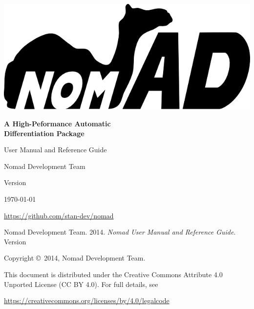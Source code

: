 
\includegraphics[width=6in]{../logo/logo.png}

\thispagestyle{empty}
\begin{center}

{ \Huge \textbf{ A High-Peformance Automatic \\ Differentiation Package} }

\vspace{10mm}

{ \LARGE User Manual and Reference Guide }

\vspace{20mm}

{ \Large Nomad Development Team }

\vfill

{ \Large

Version \nomadversion

\today

\url{https://github.com/stan-dev/nomad}

}

\end{center}

\newpage
\thispagestyle{empty}

\mbox{}
\vfill


\noindent Nomad Development Team. 2014.  
{\it  Nomad User Manual and Reference Guide}. Version \nomadversion

\vspace{5mm}

\noindent Copyright \copyright \ 2014, Nomad Development Team.

\vspace{5mm}

\noindent This document is distributed under the Creative Commons Attribute 4.0
Unported License (CC BY 4.0).  For full details, see

\begin{center}
\url{https://creativecommons.org/licenses/by/4.0/legalcode} 
\end{center}
